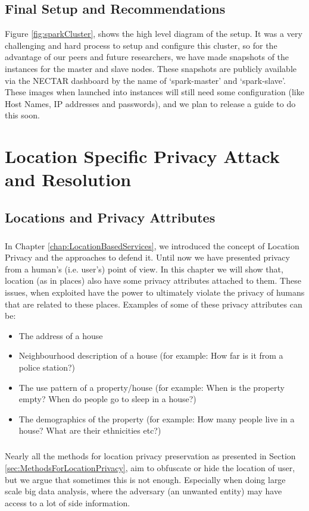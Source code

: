 \documentclass[12pt]{report}
\theoremstyle{named}
\begin{document}
\section{Final Setup and Recommendations}
Figure \ref{fig:sparkCluster}, shows the high level diagram of the setup. It was a very challenging and hard process to setup and configure this cluster, so for the advantage of our peers and future researchers, we have made snapshots of the instances for the master and slave nodes. These snapshots are publicly available via the NECTAR dashboard by the name of `spark-master' and `spark-slave'. These images when launched into instances will still need some configuration (like Host Names, IP addresses and passwords), and we plan to release a guide to do this soon.



\chapter{Location Specific Privacy Attack and Resolution}
\section{Locations and Privacy Attributes}
\paragraph{}
In Chapter \ref{chap:LocationBasedServices}, we introduced the concept of Location Privacy and the approaches to defend it. Until now we have presented privacy from a human's (i.e. user's) point of view. In this chapter we will show that, location (as in places) also have some privacy attributes attached to them. These issues, when exploited have the power to ultimately violate the privacy of humans that are related to these places. Examples of some of these privacy attributes can be:
\begin{itemize}
  \item The address of a house
  \item Neighbourhood description of a house (for example: How far is it from a police station?)
  \item The use pattern of a property/house (for example: When is the property empty? When do people go to sleep in a house?) 
  \item The demographics of the property (for example: How many people live in a house? What are their ethnicities etc?)
\end{itemize}
\paragraph{}
Nearly all the methods for location privacy preservation as presented in Section \ref{sec:MethodsForLocationPrivacy}, aim to obfuscate or hide the location of user, but we argue that sometimes this is not enough. Especially when doing large scale big data analysis, where the adversary (an unwanted entity) may have access to a lot of side information. 
\end{document}
